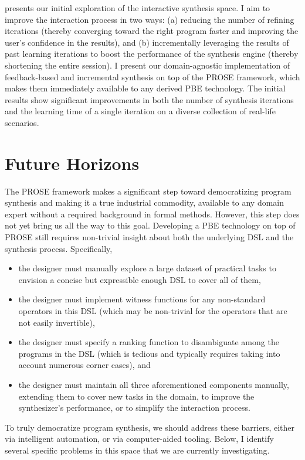  presents our initial exploration of the interactive synthesis space.
I aim to improve the interaction process in two ways:
(a) reducing the number of refining iterations (thereby converging toward the right program faster and improving the
user's confidence in the results), and
(b) incrementally leveraging the results of past learning iterations to boost the performance of the synthesis engine
(thereby shortening the entire session).
I present our domain-agnostic implementation of feedback-based and incremental synthesis on top of the PROSE framework,
which makes them immediately available to any derived PBE technology.
The initial results show significant improvements in both the number of synthesis iterations and the learning time of a
single iteration on a diverse collection of real-life scenarios.

\section{Future Horizons}

The PROSE framework makes a significant step toward democratizing program synthesis and making it a true industrial
commodity, available to any domain expert without a required background in formal methods.
However, this step does not yet bring us all the way to this goal.
Developing a PBE technology on top of PROSE still requires non-trivial insight about both the underlying DSL and the
synthesis process.
Specifically,
\begin{itemize}[nosep]
    \item the designer must manually explore a large dataset of practical tasks to envision a concise but expressible
        enough DSL to cover all of them,
    \item the designer must implement witness functions for any non-standard operators in this DSL (which may be
        non-trivial for the operators that are not easily invertible),
    \item the designer must specify a ranking function to disambiguate among the programs in the DSL (which is tedious
        and typically requires taking into account numerous corner cases), and
    \item the designer must maintain all three aforementioned components manually, extending them to cover new tasks in
        the domain, to improve the synthesizer's performance, or to simplify the interaction process.
\end{itemize}
To truly democratize program synthesis, we should address these barriers, either via intelligent automation, or via
computer-aided tooling.
Below, I identify several specific problems in this space that we are currently investigating.

